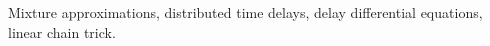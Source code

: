 \begin{keywords}
	Mixture approximations,
	distributed time delays,
	delay differential equations,
	linear chain trick.
\end{keywords}

